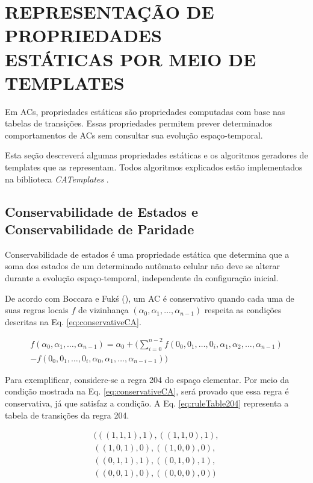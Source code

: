 \section[REPRESENTAÇÃO DE PROPRIEDADES ESTÁTICAS POR MEIO DE TEMPLATES]{REPRESENTAÇÃO DE PROPRIEDADES \\ ESTÁTICAS POR MEIO DE TEMPLATES}
\label{sec:propriedadesEstaticas}

Em ACs, propriedades estáticas são propriedades computadas com base nas tabelas de transições. Essas propriedades permitem prever determinados comportamentos de ACs sem consultar sua evolução espaço-temporal. 

Esta seção descreverá algumas propriedades estáticas e os algoritmos geradores de templates que as representam. Todos algoritmos explicados estão implementados na biblioteca \textit{CATemplates} \cite{CATemplates}.

\subsection{Conservabilidade de Estados e Conservabilidade de Paridade}
Conservabilidade de estados é uma propriedade estática que determina que a soma dos estados de um determinado autômato celular não deve se alterar durante a evolução espaço-temporal, independente da configuração inicial.

De acordo com Boccara e Fukś (\citeyear{boccara2002}), um AC é conservativo quando cada uma de suas regras locais $f$ de vizinhança $(\alpha_0,\alpha_1, \dots, \alpha_{n-1})$ respeita as condições descritas na Eq. \eqref{eq:conservativeCA}.

\begin{equation}
\begin{split}
f(\alpha_0,\alpha_1, \dots,\alpha_{n-1}) = \alpha_0 + (\sum_{i=0}^{n-2}f(0_0,0_1, \dots,0_i,\alpha_1,\alpha_2, \dots,\alpha_{n-1}) \\- f(0_0,0_1, \dots,0_i,\alpha_0,\alpha_1, \dots,\alpha_{n-i-1}))
\label{eq:conservativeCA}
\end{split}
\end{equation}

Para exemplificar, considere-se a regra 204 do espaço elementar. Por meio da condição mostrada na Eq. \eqref{eq:conservativeCA}, será provado que essa regra é conservativa, já que satisfaz a condição. A Eq. \eqref{eq:ruleTable204} representa a tabela de transições da regra 204.

\begin{equation}
\begin{split}
(((1,1,1),1),((1,1,0),1),\\((1,0,1),0),((1,0,0),0),\\((0,1,1),1),((0,1,0),1),\\((0,0,1),0),((0,0,0),0))
\label{eq:ruleTable204}
\end{split}
\end{equation}

